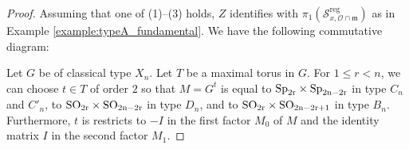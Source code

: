 \documentclass{amsart}
\theoremstyle{definition}
\DeclareMathOperator{\reg}{reg}
\newcommand{\cS}{\mathcal{S}}
\newcommand{\frakm}{\mathfrak{m}}
\newcommand{\0}{\mathcal{O}}
\begin{document}
\begin{proof}
Assuming that one of (1)--(3) holds, $Z$ identifies with $\pi_1(\cS^{\reg}_{x, \0\cap\frakm})$
as in Example \ref{example:typeA_fundamental}.
We have the following commutative diagram:
\begin{center}
\end{center}

Let $G$ be of classical type $X_n$.  Let $T$ be a maximal torus in $G$.
For $1 \leq r < n$, we can choose $t \in T$ of order $2$ so that 
$M = G^t$ is equal to
$\rm{Sp}_{2r} \times \rm{Sp}_{2n-2r}$ in type $C_n$ and $C'_n$, 
to $\rm{SO}_{2r} \times \rm{SO}_{2n-2r}$ in type $D_n$,
and 
to $\rm{SO}_{2r} \times \rm{SO}_{2n-2r+1}$ in type $B_n$.
Furthermore, $t$ is restricts to $-I$ in the first factor $M_0$ of $M$ 
and the identity matrix $I$ in the second factor $M_1$.


\end{proof}
\end{document}
